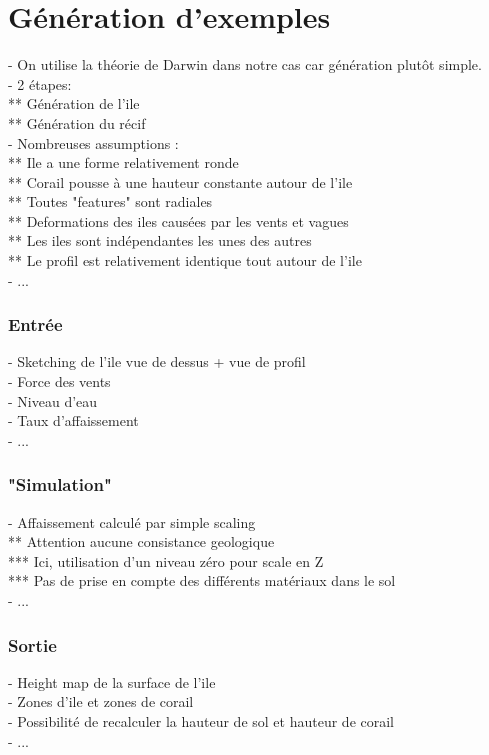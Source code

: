 \section{Génération d'exemples}
\label{sec:coral-island_example-generation}
- On utilise la théorie de Darwin dans notre cas car génération plutôt simple. \\
- 2 étapes: \\
** Génération de l'ile \\
** Génération du récif \\
- Nombreuses assumptions : \\
** Ile a une forme relativement ronde \\
** Corail pousse à une hauteur constante autour de l'ile \\
** Toutes "features" sont radiales \\
** Deformations des iles causées par les vents et vagues \\
** Les iles sont indépendantes les unes des autres \\
** Le profil est relativement identique tout autour de l'ile \\
- ... 

\subsubsection{Entrée}
- Sketching de l'ile vue de dessus + vue de profil \\
- Force des vents \\
- Niveau d'eau \\
- Taux d'affaissement \\
- ...

\subsubsection{"Simulation"}
- Affaissement calculé par simple scaling \\
** Attention aucune consistance geologique \\
*** Ici, utilisation d'un niveau zéro pour scale en Z \\
*** Pas de prise en compte des différents matériaux dans le sol \\
- ...

\subsubsection{Sortie}
- Height map de la surface de l'ile \\
- Zones d'ile et zones de corail \\
- Possibilité de recalculer la hauteur de sol et hauteur de corail \\
- ...

